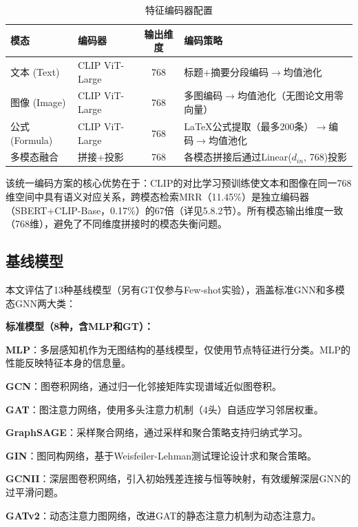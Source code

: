 \begin{table}[htbp]
  \centering
  \caption{特征编码器配置}
  \label{tab:encoders}
  \begin{tabular}{llcp{4.5cm}}
    \toprule
    模态 & 编码器 & 输出维度 & 编码策略 \\
    \midrule
    文本 (Text) & CLIP\cite{radford2021clip} ViT-Large & 768 & 标题+摘要分段编码$\to$均值池化 \\
    图像 (Image) & CLIP ViT-Large & 768 & 多图编码$\to$均值池化（无图论文用零向量） \\
    公式 (Formula) & CLIP ViT-Large & 768 & LaTeX公式提取（最多200条）$\to$编码$\to$均值池化 \\
    多模态融合 & 拼接+投影 & 768 & 各模态拼接后通过Linear($d_{in}$, 768)投影 \\
    \bottomrule
  \end{tabular}
\end{table}

该统一编码方案的核心优势在于：CLIP的对比学习预训练使文本和图像在同一768维空间中具有语义对应关系，跨模态检索MRR（11.45\%）是独立编码器（SBERT+CLIP-Base，0.17\%）的67倍（详见5.8.2节）。所有模态输出维度一致（768维），避免了不同维度拼接时的模态失衡问题。

\subsection{基线模型}

本文评估了13种基线模型（另有GT仅参与Few-shot实验），涵盖标准GNN和多模态GNN两大类：

\textbf{标准模型（8种，含MLP和GT）：}

\textbf{MLP}：多层感知机作为无图结构的基线模型，仅使用节点特征进行分类。MLP的性能反映特征本身的信息量。

\textbf{GCN}\cite{kipf2017gcn}：图卷积网络，通过归一化邻接矩阵实现谱域近似图卷积。

\textbf{GAT}\cite{velickovic2018gat}：图注意力网络，使用多头注意力机制（4头）自适应学习邻居权重。

\textbf{GraphSAGE}\cite{hamilton2017graphsage}：采样聚合网络，通过采样和聚合策略支持归纳式学习。

\textbf{GIN}\cite{xu2019gin}：图同构网络，基于Weisfeiler-Lehman测试理论设计求和聚合策略。

\textbf{GCNII}：深层图卷积网络，引入初始残差连接与恒等映射，有效缓解深层GNN的过平滑问题。

\textbf{GATv2}：动态注意力图网络，改进GAT的静态注意力机制为动态注意力。


